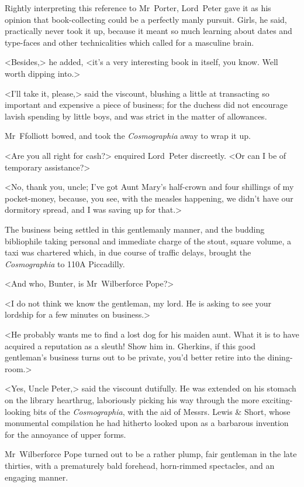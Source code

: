 Rightly interpreting this reference to Mr~Porter, Lord~Peter gave it as his opinion that book-collecting could be a perfectly manly pursuit. Girls, he said, practically never took it up, because it meant so much learning about dates and type-faces and other technicalities which called for a masculine brain.

<Besides,> he added, <it's a very interesting book in itself, you know. Well worth dipping into.>

<I'll take it, please,> said the viscount, blushing a little at transacting so important and expensive a piece of business; for the duchess did not encourage lavish spending by little boys, and was strict in the matter of allowances.

Mr~Ffolliott bowed, and took the \textit{Cosmographia} away to wrap it up.

<Are you all right for cash?> enquired Lord~Peter discreetly. <Or can I be of temporary assistance?>

<No, thank you, uncle; I've got Aunt Mary's half-crown and four shillings of my pocket-money, because, you see, with the measles happening, we didn't have our dormitory spread, and I was saving up for that.>

The business being settled in this gentlemanly manner, and the budding bibliophile taking personal and immediate charge of the stout, square volume, a taxi was chartered which, in due course of traffic delays, brought the \textit{Cosmographia} to 110A Piccadilly.

\divider\pagebreak[2]

<And who, Bunter, is Mr~Wilberforce Pope?>

<I do not think we know the gentleman, my lord. He is asking to see your lordship for a few minutes on business.>

<He probably wants me to find a lost dog for his maiden aunt. What it is to have acquired a reputation as a sleuth! Show him in. Gherkins, if this good gentleman's business turns out to be private, you'd better retire into the dining-room.>

<Yes, Uncle Peter,> said the viscount dutifully. He was extended on his stomach on the library hearthrug, laboriously picking his way through the more exciting-looking bits of the \textit{Cosmographia}, with the aid of Messrs. Lewis \& Short, whose monumental compilation he had hitherto looked upon as a barbarous invention for the annoyance of upper forms.

Mr~Wilberforce Pope turned out to be a rather plump, fair gentleman in the late thirties, with a prematurely bald forehead, horn-rimmed spectacles, and an engaging manner.

